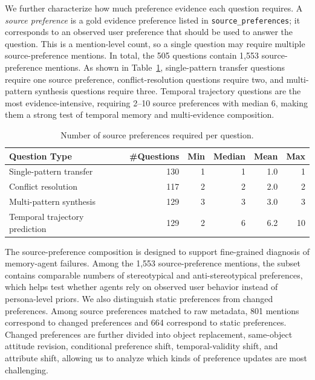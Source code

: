\documentclass{article}
\begin{document}
We further characterize how much preference evidence each question requires. A \emph{source preference} is a gold evidence preference listed in \texttt{source\_preferences}; it corresponds to an observed user preference that should be used to answer the question. This is a mention-level count, so a single question may require multiple source-preference mentions. In total, the 505 questions contain 1,553 source-preference mentions. As shown in Table~\ref{tab:personamem_evo_source_count}, single-pattern transfer questions require one source preference, conflict-resolution questions require two, and multi-pattern synthesis questions require three. Temporal trajectory questions are the most evidence-intensive, requiring 2--10 source preferences with median 6, making them a strong test of temporal memory and multi-evidence composition.

\begin{table}[!htbp]
\centering
\small
\begin{tabular}{lrrrrr}
\toprule
\textbf{Question Type} & \textbf{\#Questions} & \textbf{Min} & \textbf{Median} & \textbf{Mean} & \textbf{Max} \\
\midrule
Single-pattern transfer & 130 & 1 & 1 & 1.0 & 1 \\
Conflict resolution & 117 & 2 & 2 & 2.0 & 2 \\
Multi-pattern synthesis & 129 & 3 & 3 & 3.0 & 3 \\
Temporal trajectory prediction & 129 & 2 & 6 & 6.2 & 10 \\
\bottomrule
\end{tabular}
\caption{Number of source preferences required per question.}
\label{tab:personamem_evo_source_count}
\end{table}

The source-preference composition is designed to support fine-grained diagnosis of memory-agent failures. Among the 1,553 source-preference mentions, the subset contains comparable numbers of stereotypical and anti-stereotypical preferences, which helps test whether agents rely on observed user behavior instead of persona-level priors. We also distinguish static preferences from changed preferences. Among source preferences matched to raw metadata, 801 mentions correspond to changed preferences and 664 correspond to static preferences. Changed preferences are further divided into object replacement, same-object attitude revision, conditional preference shift, temporal-validity shift, and attribute shift, allowing us to analyze which kinds of preference updates are most challenging.
\end{document}
